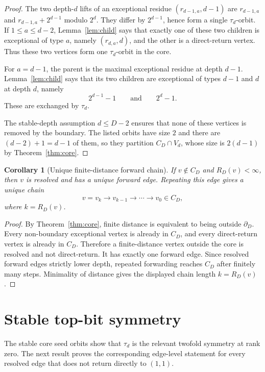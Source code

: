 \documentclass[11pt]{article}
\newtheorem{corollary}[theorem]{Corollary}
\theoremstyle{definition}
\theoremstyle{remark}
\newcommand{\bdD}{\partial_D}
\begin{document}
\begin{proof}
The two depth-$d$ lifts of an exceptional residue $(r_{d-1,a},d-1)$ are $r_{d-1,a}$ and $r_{d-1,a}+2^{d-1}$ modulo $2^d$.  They differ by $2^{d-1}$, hence form a single $\tau_d$-orbit.  If $1\le a\le d-2$, Lemma~\ref{lem:child} says that exactly one of these two children is exceptional of type $a$, namely $(r_{d,a},d)$, and the other is a direct-return vertex.  Thus these two vertices form one $\tau_d$-orbit in the core.

For $a=d-1$, the parent is the maximal exceptional residue at depth $d-1$.  Lemma~\ref{lem:child} says that its two children are exceptional of types $d-1$ and $d$ at depth $d$, namely
\[
2^{d-1}-1
\qquad\text{and}\qquad
2^d-1.
\]
These are exchanged by $\tau_d$.

The stable-depth assumption $d\le D-2$ ensures that none of these vertices is removed by the boundary.  The listed orbits have size $2$ and there are $(d-2)+1=d-1$ of them, so they partition $C_D\cap V_d$, whose size is $2(d-1)$ by Theorem~\ref{thm:core}.
\end{proof}

\begin{corollary}[Unique finite-distance forward chain]\label{cor:unique-chain}
If $v\notin C_D$ and $R_D(v)<\infty$, then $v$ is resolved and has a unique forward edge.  Repeating this edge gives a unique chain
\[
v=v_k\to v_{k-1}\to\cdots\to v_0\in C_D,
\]
where $k=R_D(v)$.
\end{corollary}

\begin{proof}
By Theorem~\ref{thm:core}, finite distance is equivalent to being outside $\bdD$.  Every non-boundary exceptional vertex is already in $C_D$, and every direct-return vertex is already in $C_D$.  Therefore a finite-distance vertex outside the core is resolved and not direct-return.  It has exactly one forward edge.  Since resolved forward edges strictly lower depth, repeated forwarding reaches $C_D$ after finitely many steps.  Minimality of distance gives the displayed chain length $k=R_D(v)$.
\end{proof}

\section{Stable top-bit symmetry}\label{sec:topbit}

The stable core seed orbits show that $\tau_d$ is the relevant twofold symmetry at rank zero.  The next result proves the corresponding edge-level statement for every resolved edge that does not return directly to $(1,1)$.
\end{document}
